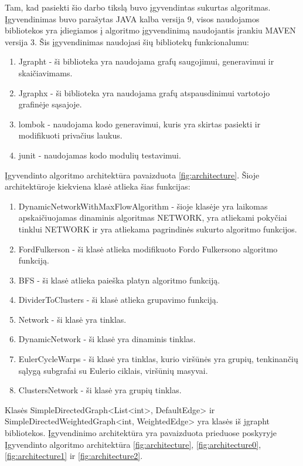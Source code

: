 Tam, kad pasiekti šio darbo tikslą buvo įgyvendintas sukurtas algoritmas. Įgyvendinimas buvo parašytas JAVA kalba versija 9, visos naudojamos bibliotekos yra įdiegiamos į algoritmo įgyvendinimą naudojantis įrankiu MAVEN versija 3. Šis įgyvendinimas naudojasi šių bibliotekų funkcionalumu: 
\begin{enumerate}
	\item Jgrapht - ši biblioteka yra naudojama grafų saugojimui, generavimui ir skaičiavimams.
	\item Jgraphx - ši biblioteka yra naudojama grafų atspausdinimui vartotojo grafinėje sąsajoje.
	\item lombok - naudojama kodo generavimui, kuris yra skirtas pasiekti ir modifikuoti privačius laukus.
	\item junit - naudojamas kodo modulių testavimui.
\end{enumerate}

Įgyvendinto algoritmo architektūra pavaizduota \ref{fig:architecture}. Šioje architektūroje kiekviena klasė atlieka šias funkcijas:
\begin{enumerate}
	\item DynamicNetworkWithMaxFlowAlgorithm - šioje klasėje yra laikomas apskaičiuojamas dinaminis algoritmas NETWORK, yra atliekami pokyčiai tinklui NETWORK ir yra atliekama pagrindinės sukurto algoritmo funkcijos.
	\item FordFulkerson - ši klasė atlieka modifikuoto Fordo Fulkersono algoritmo funkciją.
	\item BFS - ši klasė atlieka paieška platyn algoritmo funkciją.
	\item DividerToClusters - ši klasė atlieka grupavimo funkciją.
	\item Network - ši klasė yra tinklas.
	\item DynamicNetwork - ši klasė yra dinaminis tinklas.
	\item EulerCycleWarps - ši klasė yra tinklas, kurio viršūnės yra grupių, tenkinančių sąlygą subgrafai su Eulerio ciklais, viršūnių masyvai.
	\item ClustersNetwork - ši klasė yra grupių tinklas.
\end{enumerate}
Klasės SimpleDirectedGraph<List<int>, DefaultEdge> ir SimpleDirectedWeightedGraph<int, WeightedEdge> yra klasės iš jgrapht bibliotekos. Įgyvendinimo architektūra yra pavaizduota prieduose poskyryje Įgyvendinto algoritmo architektūra \ref{fig:architecture}, \ref{fig:architecture0}, \ref{fig:architecture1} ir  \ref{fig:architecture2}.